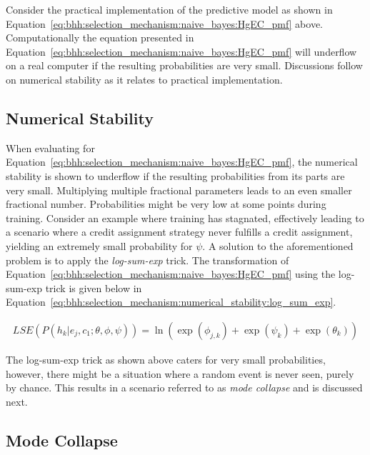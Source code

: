 Consider the practical implementation of the predictive model as shown in Equation~\eqref{eq:bhh:selection_mechanism:naive_bayes:HgEC_pmf} above. Computationally the equation presented in Equation~\eqref{eq:bhh:selection_mechanism:naive_bayes:HgEC_pmf} will underflow on a real computer if the resulting probabilities are very small. Discussions follow on numerical stability as it relates to practical implementation.

\subsection{Numerical Stability}\label{sec:bhh:selection_mechanism:numerical_stability}

When evaluating for Equation~\eqref{eq:bhh:selection_mechanism:naive_bayes:HgEC_pmf}, the numerical stability is shown to underflow if the resulting probabilities from its parts are very small. Multiplying multiple fractional parameters leads to an even smaller fractional number. Probabilities might be very low at some points during training. Consider an example where training has stagnated, effectively leading to a scenario where a credit assignment strategy never fulfills a credit assignment, yielding an extremely small probability for $\psi$. A solution to the aforementioned problem is to apply the \textit{log-sum-exp} trick. The transformation of Equation~\eqref{eq:bhh:selection_mechanism:naive_bayes:HgEC_pmf} using the log-sum-exp trick is given below in Equation~\eqref{eq:bhh:selection_mechanism:numerical_stability:log_sum_exp}.

\begin{equation}
      \label{eq:bhh:selection_mechanism:numerical_stability:log_sum_exp}
      \begin{split}
            LSE(P(h_{k} \vert e_{j}, c_{1};  \theta, \phi, \psi)) = \ln(\exp(\phi_{j,k}) +  \exp(\psi_{k}) + \exp(\theta_{k}))
      \end{split}
\end{equation}

The log-sum-exp trick as shown above caters for very small probabilities, however, there might be a situation where  a random event is never seen, purely by chance. This results in a scenario referred to as \textit{mode collapse} and is discussed next.

\subsection{Mode Collapse}\label{sec:bhh:selection_mechanism:mode_collapse}

